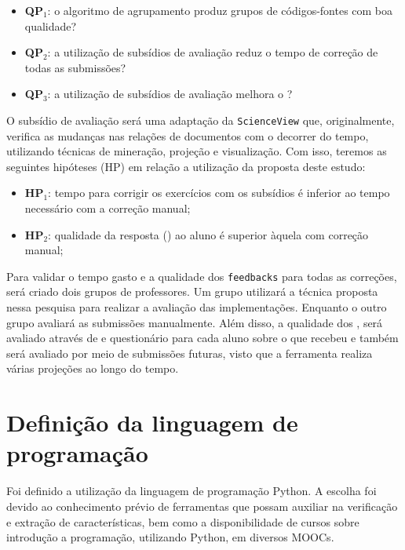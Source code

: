 	 	\begin{itemize}
	 		\item \textbf{QP$_1$}: o algoritmo de agrupamento produz grupos de códigos-fontes
	 		com boa qualidade?
	 		\item \textbf{QP$_2$}: a utilização de subsídios de avaliação reduz o tempo
	 		de correção de todas as submissões?
	 		\item \textbf{QP$_3$}: a utilização de subsídios de avaliação melhora o ?
	 	\end{itemize}
	 	
	 	O subsídio de avaliação será uma adaptação da \texttt{ScienceView} \cite{Alencar-etal:2012}
	 	que, originalmente, verifica as mudanças nas relações de documentos com o decorrer do tempo,
	 	utilizando técnicas de mineração, projeção e visualização. Com isso, teremos as
	 	seguintes hipóteses (HP) em relação a utilização da proposta deste estudo:
	 	
	 	\begin{itemize}
	 		\item \textbf{HP$_1$}: tempo para corrigir os exercícios com os subsídios é inferior
	 		ao tempo necessário com a correção manual;
	 		\item \textbf{HP$_2$}: qualidade da resposta () ao aluno é superior
	 		àquela com correção manual;
	 	\end{itemize}
	 	
	 	Para validar o tempo gasto e a qualidade dos \texttt{feedbacks} para todas as correções,
	 	será criado dois grupos de professores. Um grupo utilizará a técnica proposta nessa pesquisa para
	 	realizar a avaliação das implementações. Enquanto o outro grupo avaliará as submissões
	 	manualmente. Além disso, a qualidade dos , será avaliado através de 
	 	e questionário para cada aluno sobre o  que recebeu e também será avaliado
	 	por meio de submissões futuras, visto que a ferramenta realiza várias projeções ao longo do tempo.

	\section{Definição da linguagem de programação}
		Foi definido a utilização da linguagem de programação Python. A escolha foi
		devido ao conhecimento prévio de ferramentas que possam auxiliar na verificação
		e extração de características, bem como a disponibilidade de cursos sobre
		introdução a programação, utilizando Python, em diversos \acs{MOOC}s.

